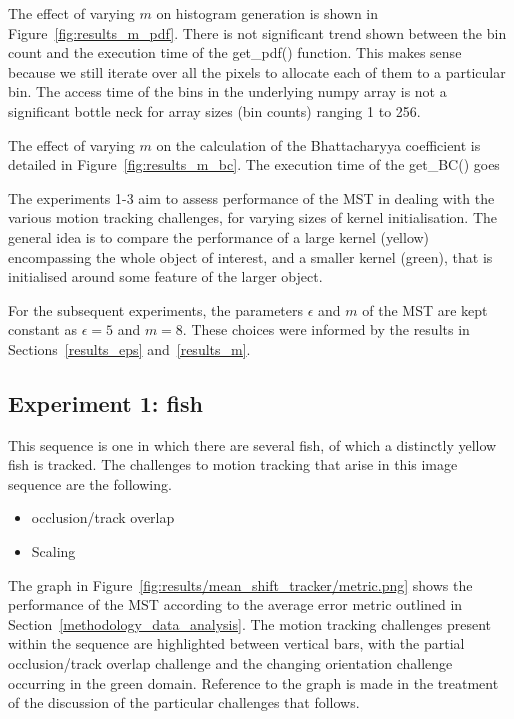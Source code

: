 The effect of varying $m$ on histogram generation is shown in
Figure~\ref{fig:results_m_pdf}. There is not significant trend shown between the
bin count and the execution time of the get\_pdf() function. This makes sense
because we still iterate over all the pixels to allocate each of them to a
particular bin. The access time of the bins in the underlying numpy array is not
a significant bottle neck for array sizes (bin counts) ranging 1 to 256.

The effect of varying $m$ on the calculation of the Bhattacharyya coefficient is
detailed in Figure~\ref{fig:results_m_bc}. The execution time of the get\_BC() goes  



The experiments 1-3 aim to assess performance of the MST in dealing with the
various motion tracking challenges, for varying sizes of kernel initialisation.
The general idea is to compare the performance of a large kernel (yellow)
encompassing the whole object of interest, and a smaller kernel (green), that is
initialised around some feature of the larger object. 

For the subsequent experiments, the parameters $\epsilon$ and $m$ of the MST are
kept constant as $\epsilon=5$ and $m=8$. These choices were informed by the results in
Sections~\ref{results_eps} and~\ref{results_m}. 

\subsection{Experiment 1: fish}
This sequence is one in which there are several fish, of which a distinctly yellow fish is
tracked. The challenges to motion tracking that arise in this image sequence are the following.
\begin{itemize}
    \item occlusion/track overlap
    \item Scaling 
\end{itemize}

The graph in Figure~\ref{fig:results/mean_shift_tracker/metric.png} shows the
performance of the MST according to the average error metric outlined in
Section~\ref{methodology_data_analysis}. 
The motion tracking challenges present within the sequence are highlighted
between vertical bars, with the partial occlusion/track overlap challenge and the changing orientation challenge occurring in the green domain.
Reference to the graph is made in the treatment of the discussion of the
particular challenges that follows.

